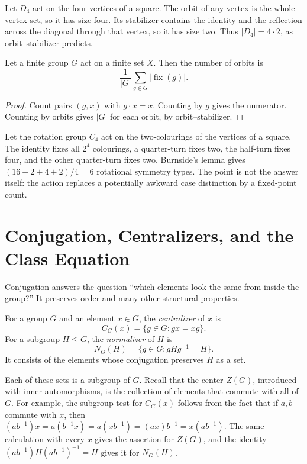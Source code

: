 \begin{example}
Let \(D_4\) act on the four vertices of a square.  The orbit of any vertex is
the whole vertex set, so it has size four.  Its stabilizer contains the identity
and the reflection across the diagonal through that vertex, so it has size two.
Thus \(|D_4|=4\cdot2\), as orbit--stabilizer predicts.
\end{example}

\begin{corollary}
Let a finite group \(G\) act on a finite set \(X\). Then the number of orbits is
\[
\frac{1}{|G|}\sum_{g\in G}|\operatorname{fix}(g)|.
\]
\end{corollary}
\begin{proof}
Count pairs \((g,x)\) with \(g\cdot x=x\).  Counting by \(g\) gives the
numerator.  Counting by orbits gives \(|G|\) for each orbit, by
orbit--stabilizer.
\end{proof}

\begin{example}
Let the rotation group \(C_4\) act on the two-colourings of the vertices of a
square.  The identity fixes all \(2^4\) colourings, a quarter-turn fixes two,
the half-turn fixes four, and the other quarter-turn fixes two.  Burnside's
lemma gives \((16+2+4+2)/4=6\) rotational symmetry types.  The point is not
the answer itself: the action replaces a potentially awkward case distinction
by a fixed-point count.
\end{example}

\section{Conjugation, Centralizers, and the Class Equation}

Conjugation answers the question ``which elements look the same from inside
the group?''  It preserves order and many other structural properties.

\begin{definition}
For a group \(G\) and an element \(x\in G\), the \emph{centralizer} of \(x\)
is
\[C_G(x)=\{g\in G:gx=xg\}.\]
For a subgroup \(H\leq G\), the \emph{normalizer} of \(H\) is
\[N_G(H)=\{g\in G:gHg^{-1}=H\}.\]
It consists of the elements whose conjugation preserves \(H\) as a set.
\end{definition}

Each of these sets is a subgroup of \(G\). Recall that the center
\(Z(G)\), introduced with inner automorphisms, is the collection of elements
that commute with all of \(G\). For example, the subgroup test
for \(C_G(x)\) follows from the fact that if \(a,b\) commute with \(x\), then
\((ab^{-1})x=a(b^{-1}x)=a(xb^{-1})=(ax)b^{-1}=x(ab^{-1})\).
The same calculation with every \(x\) gives the assertion for \(Z(G)\), and
the identity \((ab^{-1})H(ab^{-1})^{-1}=H\) gives it for \(N_G(H)\).

